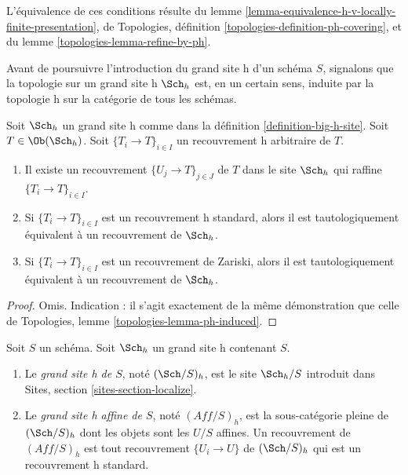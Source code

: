 \noindent
L'équivalence de ces conditions résulte du
lemme \ref{lemma-equivalence-h-v-locally-finite-presentation}, de
Topologies, définition \ref{topologies-definition-ph-covering}, et du
lemme \ref{topologies-lemma-refine-by-ph}.

\medskip\noindent
Avant de poursuivre l'introduction du grand site h d'un
schéma $S$, signalons que la topologie sur un grand site h
$\Sch_h$ est, en un certain sens, induite par la topologie h
sur la catégorie de tous les schémas.

\begin{lemma}
\label{lemma-h-induced}
Soit $\Sch_h$ un grand site h comme dans la
définition \ref{definition-big-h-site}.
Soit $T \in \Ob(\Sch_h)$.
Soit $\{T_i \to T\}_{i \in I}$ un recouvrement h arbitraire de $T$.
\begin{enumerate}
\item Il existe un recouvrement $\{U_j \to T\}_{j \in J}$ de $T$ dans le site
$\Sch_h$ qui raffine $\{T_i \to T\}_{i \in I}$.
\item Si $\{T_i \to T\}_{i \in I}$ est un recouvrement h standard, alors
il est tautologiquement équivalent à un recouvrement de $\Sch_h$.
\item Si $\{T_i \to T\}_{i \in I}$ est un recouvrement de Zariski, alors
il est tautologiquement équivalent à un recouvrement de $\Sch_h$.
\end{enumerate}
\end{lemma}

\begin{proof}
Omis. Indication : il s'agit exactement de la même démonstration que celle de
Topologies, lemme \ref{topologies-lemma-ph-induced}.
\end{proof}

\begin{definition}
\label{definition-big-small-h}
Soit $S$ un schéma. Soit $\Sch_h$ un grand site h contenant $S$.
\begin{enumerate}
\item Le {\it grand site h de $S$}, noté
$(\Sch/S)_h$, est le site $\Sch_h/S$
introduit dans Sites, section \ref{sites-section-localize}.
\item Le {\it grand site h affine de $S$}, noté
$(\textit{Aff}/S)_h$, est la sous-catégorie pleine de
$(\Sch/S)_h$ dont les objets sont les $U/S$ affines.
Un recouvrement de $(\textit{Aff}/S)_h$ est tout recouvrement
$\{U_i \to U\}$ de $(\Sch/S)_h$ qui est un recouvrement h standard.
\end{enumerate}
\end{definition}

